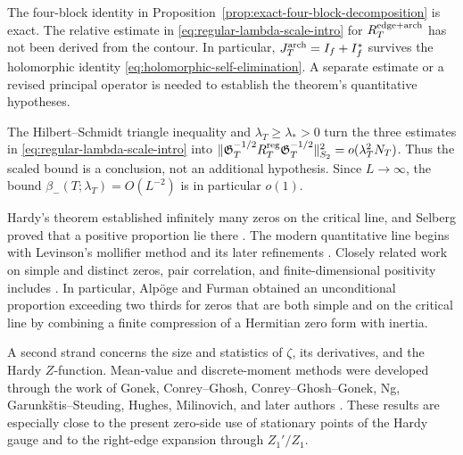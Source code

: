 \begin{remark}
The four-block identity in Proposition~\ref{prop:exact-four-block-decomposition}
is exact. The relative estimate in \eqref{eq:regular-lambda-scale-intro} for
$R_T^{\rm edge+arch}$ has not been derived from the contour. In particular,
$J_T^{\rm arch}=I_f+I_f^*$ survives the holomorphic identity
\eqref{eq:holomorphic-self-elimination}. A separate estimate or a revised
principal operator is needed to establish the theorem's quantitative hypotheses.
\end{remark}

\begin{remark}
The Hilbert--Schmidt triangle inequality and $\lambda_T\ge\lambda_*>0$ turn
the three estimates in \eqref{eq:regular-lambda-scale-intro} into
$\|\mathfrak G_T^{-1/2}R_T^{\rm reg}\mathfrak G_T^{-1/2}\|_{S_2}^2
=o(\lambda_T^2N_T)$.  Thus the scaled bound is a conclusion, not an additional
hypothesis.  Since $L\to\infty$, the bound
$\beta_-(T;\lambda_T)=O(L^{-2})$ is in particular $o(1)$.
\end{remark}

Hardy's theorem established infinitely many zeros on the critical line, and
Selberg proved that a positive proportion lie there
\cite{Hardy1914,Selberg1942,Titchmarsh}.  The modern quantitative line begins
with Levinson's mollifier method and its later refinements
\cite{Levinson1974,Young2010,Conrey1989,BCY2011,Feng2012,
PrattRobles2018,PrattRoblesZaharescuZeindler2020}.  Closely related work on
simple and distinct zeros, pair correlation, and finite-dimensional positivity
includes
\cite{HeathBrown1979,Anderson1983,Montgomery1973,ConreyGhoshGonek1998,
BuiHeathBrown2013,ChirreGoncalvesDeLaat2020,Aryan2022,
BaluyotGoldstonSuriajayaTurnage2024,GoldstonSuriajaya2025,
GoldstonSuriajaya2026,AlpogeFurman2026}.  In particular, Alp\"oge and Furman
obtained an unconditional proportion exceeding two thirds for zeros that are
both simple and on the critical line by combining a finite compression of a
Hermitian zero form with inertia.

A second strand concerns the size and statistics of $\zeta$, its derivatives,
and the Hardy $Z$-function.  Mean-value and discrete-moment methods were developed
through the work of Gonek, Conrey--Ghosh, Conrey--Ghosh--Gonek, Ng,
Garunk\v{s}tis--Steuding, Hughes, Milinovich, and later authors
\cite{Gonek1984,ConreyGhosh1985,ConreyGhosh1989,Conrey1988,
ConreyGhosh1998,GarunkstisSteuding2005,Ng2007,Hughes2002,
Milinovich2010,Milinovich2011,HughesMartinPearceCrump2024,
HughesPearceCrump2025,PearceCrump2025,HLP}.  These results are especially close
to the present zero-side use of stationary points of the Hardy gauge and to the
right-edge expansion through $Z_1'/Z_1$.

